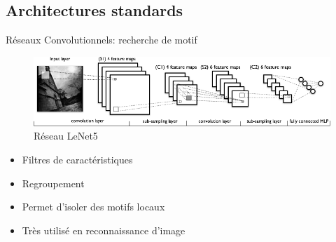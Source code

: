 \documentclass{beamer}
\begin{document}
\subsection{Architectures standards}

\begin{frame}{Réseaux Convolutionnels: recherche de motif}

    \begin{figure}
      \centering
      \includegraphics[scale=0.50]{../Figures/mylenet}
      \caption{Réseau LeNet5}
    \end{figure}

    \begin{itemize}
    \item Filtres de caractéristiques\pause
    \item Regroupement\pause
    \item Permet d'isoler des motifs locaux \pause
    \item Très utilisé en reconnaissance d'image
    \end{itemize}
\end{frame}
\end{document}
